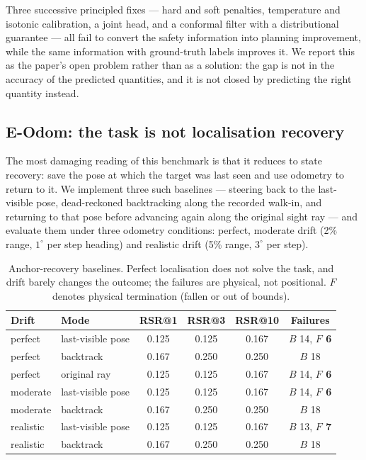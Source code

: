 \documentclass[utf8]{FrontiersinHarvard}
\begin{document}
Three successive principled fixes --- hard and soft penalties, temperature and isotonic
calibration, a joint head, and a conformal filter with a distributional guarantee ---
all fail to convert the safety information into planning improvement, while the same
information with ground-truth labels improves it. We report this as the paper's open
problem rather than as a solution: the gap is not in the accuracy of the predicted
quantities, and it is not closed by predicting the right quantity instead.

\subsection{E-Odom: the task is not localisation recovery}

The most damaging reading of this benchmark is that it reduces to state recovery: save
the pose at which the target was last seen and use odometry to return to it. We
implement three such baselines --- steering back to the last-visible pose, dead-reckoned
backtracking along the recorded walk-in, and returning to that pose before advancing
again along the original sight ray --- and evaluate them under three odometry
conditions: perfect, moderate drift (2\% range, $1^\circ$ per step heading) and
realistic drift (5\% range, $3^\circ$ per step).

\begin{table}[h]
\caption{Anchor-recovery baselines. Perfect localisation does not solve the task, and
drift barely changes the outcome; the failures are physical, not positional. $F$ denotes
physical termination (fallen or out of bounds).}
\label{tab:odom}
\begin{tabular}{llcccc}
\toprule
Drift & Mode & RSR@1 & RSR@3 & RSR@10 & Failures \\
\midrule
perfect & last-visible pose & 0.125 & 0.125 & 0.167 & $B$ 14, \textbf{$F$ 6} \\
perfect & backtrack & 0.167 & 0.250 & 0.250 & $B$ 18 \\
perfect & original ray & 0.125 & 0.125 & 0.167 & $B$ 14, \textbf{$F$ 6} \\
moderate & last-visible pose & 0.125 & 0.125 & 0.167 & $B$ 14, \textbf{$F$ 6} \\
moderate & backtrack & 0.167 & 0.250 & 0.250 & $B$ 18 \\
realistic & last-visible pose & 0.125 & 0.125 & 0.167 & $B$ 13, \textbf{$F$ 7} \\
realistic & backtrack & 0.167 & 0.250 & 0.250 & $B$ 18 \\
\bottomrule
\end{tabular}
\end{table}
\end{document}

